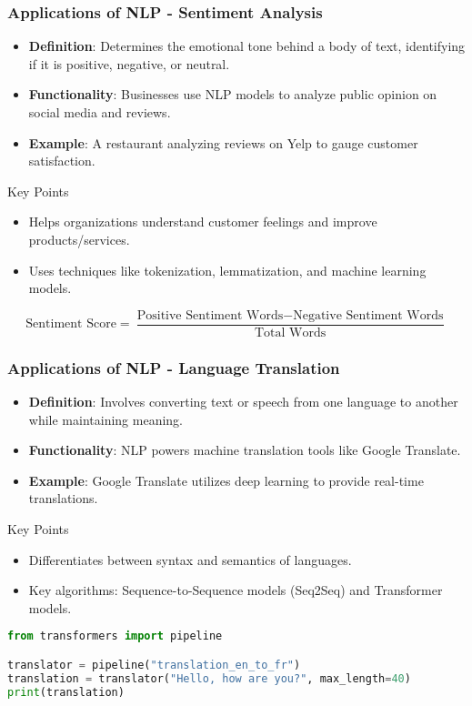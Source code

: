 \documentclass[aspectratio=169]{beamer}
\begin{document}
\begin{frame}[fragile]
    \frametitle{Applications of NLP - Sentiment Analysis}
    \begin{itemize}
        \item \textbf{Definition}: Determines the emotional tone behind a body of text, identifying if it is positive, negative, or neutral.
        \item \textbf{Functionality}: Businesses use NLP models to analyze public opinion on social media and reviews.
        \item \textbf{Example}: A restaurant analyzing reviews on Yelp to gauge customer satisfaction.
    \end{itemize}
    \begin{block}{Key Points}
        \begin{itemize}
            \item Helps organizations understand customer feelings and improve products/services.
            \item Uses techniques like tokenization, lemmatization, and machine learning models.
        \end{itemize}
    \end{block}
    \begin{equation}
        \text{Sentiment Score} = \frac{\text{Positive Sentiment Words} - \text{Negative Sentiment Words}}{\text{Total Words}}
    \end{equation}
\end{frame}

\begin{frame}[fragile]
    \frametitle{Applications of NLP - Language Translation}
    \begin{itemize}
        \item \textbf{Definition}: Involves converting text or speech from one language to another while maintaining meaning.
        \item \textbf{Functionality}: NLP powers machine translation tools like Google Translate.
        \item \textbf{Example}: Google Translate utilizes deep learning to provide real-time translations.
    \end{itemize}
    \begin{block}{Key Points}
        \begin{itemize}
            \item Differentiates between syntax and semantics of languages.
            \item Key algorithms: Sequence-to-Sequence models (Seq2Seq) and Transformer models.
        \end{itemize}
    \end{block}
    \begin{lstlisting}[language=Python]
from transformers import pipeline

translator = pipeline("translation_en_to_fr")
translation = translator("Hello, how are you?", max_length=40)
print(translation)
    \end{lstlisting}
\end{frame}
\end{document}
